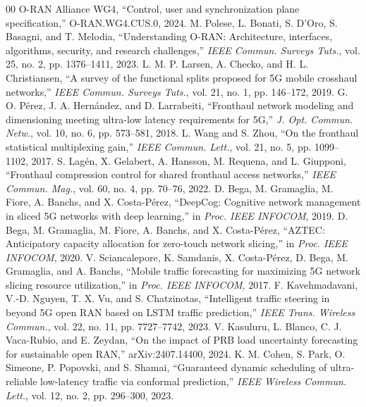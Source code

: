 \documentclass[conference]{IEEEtran}
\begin{document}
\begin{thebibliography}{00}
 O-RAN Alliance WG4, ``Control, user and synchronization plane specification,'' O-RAN.WG4.CUS.0, 2024.
 M. Polese, L. Bonati, S. D'Oro, S. Basagni, and T. Melodia, ``Understanding O-RAN: Architecture, interfaces, algorithms, security, and research challenges,'' \emph{IEEE Commun. Surveys Tuts.}, vol. 25, no. 2, pp. 1376--1411, 2023.
 L. M. P. Larsen, A. Checko, and H. L. Christiansen, ``A survey of the functional splits proposed for 5G mobile crosshaul networks,'' \emph{IEEE Commun. Surveys Tuts.}, vol. 21, no. 1, pp. 146--172, 2019.
 G. O. P\'erez, J. A. Hern\'andez, and D. Larrabeiti, ``Fronthaul network modeling and dimensioning meeting ultra-low latency requirements for 5G,'' \emph{J. Opt. Commun. Netw.}, vol. 10, no. 6, pp. 573--581, 2018.
 L. Wang and S. Zhou, ``On the fronthaul statistical multiplexing gain,'' \emph{IEEE Commun. Lett.}, vol. 21, no. 5, pp. 1099--1102, 2017.
 S. Lag\'en, X. Gelabert, A. Hansson, M. Requena, and L. Giupponi, ``Fronthaul compression control for shared fronthaul access networks,'' \emph{IEEE Commun. Mag.}, vol. 60, no. 4, pp. 70--76, 2022.
 D. Bega, M. Gramaglia, M. Fiore, A. Banchs, and X. Costa-P\'erez, ``DeepCog: Cognitive network management in sliced 5G networks with deep learning,'' in \emph{Proc. IEEE INFOCOM}, 2019.
 D. Bega, M. Gramaglia, M. Fiore, A. Banchs, and X. Costa-P\'erez, ``AZTEC: Anticipatory capacity allocation for zero-touch network slicing,'' in \emph{Proc. IEEE INFOCOM}, 2020.
 V. Sciancalepore, K. Samdanis, X. Costa-P\'erez, D. Bega, M. Gramaglia, and A. Banchs, ``Mobile traffic forecasting for maximizing 5G network slicing resource utilization,'' in \emph{Proc. IEEE INFOCOM}, 2017.
 F. Kavehmadavani, V.-D. Nguyen, T. X. Vu, and S. Chatzinotas, ``Intelligent traffic steering in beyond 5G open RAN based on LSTM traffic prediction,'' \emph{IEEE Trans. Wireless Commun.}, vol. 22, no. 11, pp. 7727--7742, 2023.
 V. Kasuluru, L. Blanco, C. J. Vaca-Rubio, and E. Zeydan, ``On the impact of PRB load uncertainty forecasting for sustainable open RAN,'' arXiv:2407.14400, 2024.
 K. M. Cohen, S. Park, O. Simeone, P. Popovski, and S. Shamai, ``Guaranteed dynamic scheduling of ultra-reliable low-latency traffic via conformal prediction,'' \emph{IEEE Wireless Commun. Lett.}, vol. 12, no. 2, pp. 296--300, 2023.

\end{thebibliography}
\end{document}
